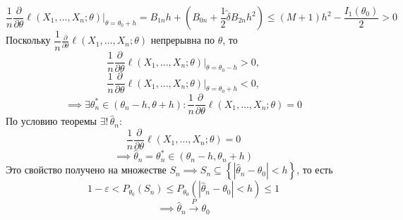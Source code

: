{    \[\frac{1}{n}\frac{\partial}{\partial\theta}\ell(X_1,\dots,X_n;\theta)\Bigg|_{\theta=\theta_0+h} = B_{1n}h + \left(B_{0n} + \frac{1}{2}\widetilde{\delta}B_{2n}h^2\right) \leq (M+1)h^2 - \frac{I_1(\theta_0)}{2} > 0\tag{32*}\]
    Поскольку $\dfrac{1}{n}\frac{\partial}{\partial\theta}\ell(X_1,\dots,X_n;\theta)$ непрерывна по $\theta$, то
    \[\frac{1}{n}\frac{\partial}{\partial\theta}\ell(X_1,\dots,X_n;\theta)\Bigg|_{\theta=\theta_0-h} > 0,\]
    \[\frac{1}{n}\frac{\partial}{\partial\theta}\ell(X_1,\dots,X_n;\theta)\Bigg|_{\theta=\theta_0+h} < 0,\]
    \[\implies \exists \theta_n^* \in \left(\theta_n - h, \theta + h\right): \frac{1}{n}\frac{\partial}{\partial\theta}\ell(X_1,\dots,X_n;\theta) = 0\]
    По условию теоремы $\exists!\,\widehat{\theta}_n$:
    \[\frac{1}{n}\frac{\partial}{\partial\theta}\ell(X_1,\dots,X_n;\theta) = 0 \tag{33*}\]
    \[\implies \widehat{\theta}_n = \theta_n^* \in \left(\theta_n - h, \theta_n + h\right)\]
    Это свойство получено на множестве $S_n \implies S_n \subseteq \left\{\left|\widehat{\theta}_n - \theta_0\right| < h\right\}$, то есть
    \[1 - \varepsilon < P_{\theta_0}(S_n) \leq P_{\theta_0}\left(\left|\widehat{\theta}_n - \theta_0\right| < h\right) \leq 1\]
    \[\implies \widehat{\theta}_n \xrightarrow{P}\theta_0\]\vspace{1cm}

}
